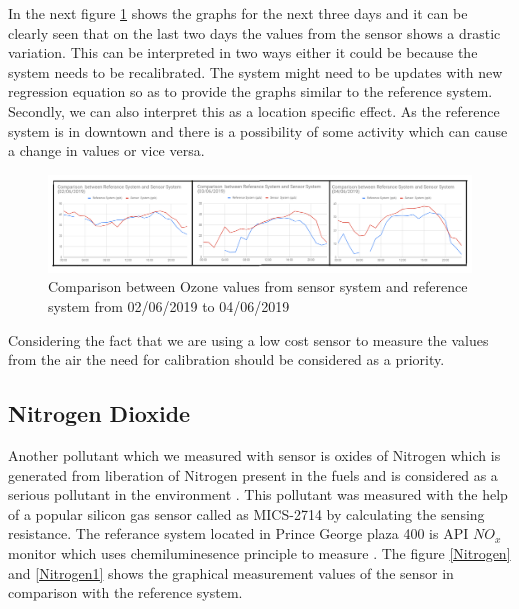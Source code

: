 In the next figure \ref{Ozone1} shows the graphs for the next three days and it can be clearly seen that on the last two days the values from the sensor shows a drastic variation. This can be interpreted in two ways either it could be because the system needs to be recalibrated. The system might need to be updates with new regression equation so as to provide the graphs similar to the reference system. Secondly, we can also interpret this as a location specific effect. As the reference system is in downtown and there is a possibility of some activity which can cause a change in values or vice versa.
  



\begin{figure}[h]
    \begin{center}
    \includegraphics[scale=0.70]{images/figure22.png}
    \end{center}
    \caption{Comparison between Ozone values from sensor system and reference system from 02/06/2019 to 04/06/2019}
    \label{Ozone1}

  \end{figure}

  \bigskip

   Considering the fact that we are using a low cost sensor to measure the values from the air the need for calibration should be considered as a priority.


   \subsection{Nitrogen Dioxide}

   Another pollutant which we measured with sensor is oxides of Nitrogen which is generated from liberation of Nitrogen present in the fuels and is considered as a serious pollutant in the environment \cite{Salonen2019} \cite{govcanada}. This pollutant was measured with the help of a popular silicon gas sensor called as MICS-2714 by calculating the sensing resistance. The referance system located in Prince George plaza 400 is API $NO_{x}$ monitor \cite{Environment2010} which uses chemiluminesence principle to measure . The figure \ref{Nitrogen} and \ref{Nitrogen1} shows the graphical measurement values of the sensor in comparison with the reference system. 


